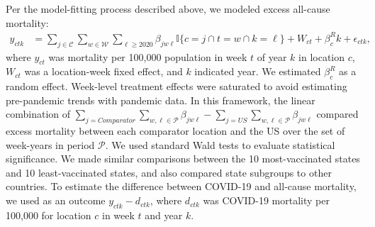 \documentclass[
]{article}
\begin{document}
Per the model-fitting process described above, we modeled excess
all-cause mortality: \begin{align*}
y_{ctk} &= \sum_{j \in \mathcal{C}} \sum_{w \in \mathcal{W}} \sum_{\ell \geq 2020} \beta_{jw\ell} \mathbb{I}\{c=j \cap t = w \cap k = \ell\} + {W}_{ct} + \beta_c^R k + \epsilon_{ctk},
\end{align*} where \(y_{ct}\) was mortality per 100,000 population in
week \(t\) of year \(k\) in location \(c\), \({W}_{ct}\) was a
location-week fixed effect, and \(k\) indicated year. We estimated
\(\beta_c^R\) as a random effect. Week-level treatment effects were
saturated to avoid estimating pre-pandemic trends with pandemic data. In
this framework, the linear combination of
\(\sum_{j = Comparator} \sum_{w,\ell \in \mathcal{P}} \beta_{j w \ell} - \sum_{j = US} \sum_{w, \ell \in \mathcal{P}} \beta_{jw\ell}\)
compared excess mortality between each comparator location and the US
over the set of week-years in period \(\mathcal{P}\). We used standard
Wald tests to evaluate statistical significance. We made similar
comparisons between the 10 most-vaccinated states and 10
least-vaccinated states, and also compared state subgroups to other
countries. To estimate the difference between COVID-19 and all-cause
mortality, we used as an outcome \(y_{ctk} - d_{ctk}\), where
\(d_{ctk}\) was COVID-19 mortality per 100,000 for location \(c\) in
week \(t\) and year \(k\).
\end{document}
